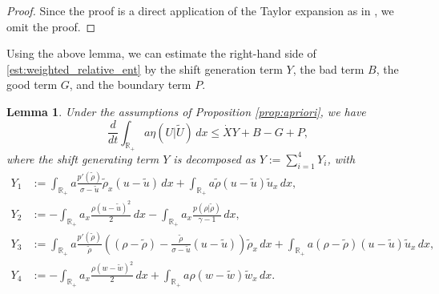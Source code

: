 \documentclass[11pt,reqno]{amsart}
\newtheorem{lemma}{Lemma}[section]
\numberwithin{equation}{section} %
\begin{document}
\begin{proof}
	Since the proof is a direct application of the Taylor expansion as in \cite{KOW25}, we omit the proof.
\end{proof}

Using the above lemma, we can estimate the right-hand side of \eqref{est:weighted_relative_ent} by the shift generation term $Y$, the bad term $B$, the good term $G$, and the boundary term $P$.

\begin{lemma}\label{lem:XBG} 
Under the assumptions of Proposition \ref{prop:apriori}, we have
\begin{equation}\label{eq:decomp_XBG}
    \frac{d}{dt}\int_{\mathbb{R}_+} a \eta(U|\widetilde{U}) \, dx \le \dot{X}Y + B - G + P,
\end{equation}
where the shift generating term $Y$ is decomposed as $Y := \sum_{i=1}^4 Y_i$, with
\begin{align*}
Y_1 &:= \int_{\mathbb{R}_+} a \frac{p'(\tilde{\rho})}{\sigma-\tilde{u}} \tilde{\rho}_x (u-\tilde{u}) \, dx + \int_{\mathbb{R}_+} a \tilde{\rho} (u-\tilde{u}) \tilde{u}_x \, dx,\\
Y_2 &:=  - \int_{\mathbb{R}_+} a_x  \frac{\rho (u- \tilde{u})^2}{2} \, dx - \int_{\mathbb{R}_+} a_x \frac{p(\rho|\tilde{\rho})}{\gamma-1} \, dx,\\
Y_3 &:= \int_{\mathbb{R}_+} a \frac{p'(\tilde{\rho})}{\tilde{\rho}} \left( (\rho-\tilde{\rho})-\frac{\tilde{\rho}}{\sigma-\tilde{u}}(u-\tilde{u}) \right)\tilde{\rho}_x \, dx + \int_{\mathbb{R}_+} a (\rho-\tilde{\rho})(u-\tilde{u}) \tilde{u}_x \, dx,\\
Y_4 &:=- \int_{\mathbb{R}_+} a_x  \frac{\rho(w-\tilde{w})^2}{2} \, dx  +  \int_{\mathbb{R}_+} a \rho %
(w-\tilde{w})\tilde{w}_x\, dx.
\end{align*}


\end{lemma}
\end{document}
